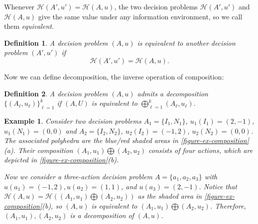 \documentclass[11pt]{article}
\theoremstyle{plain}
\newtheorem{defn}{Definition}
\newtheorem{ex}{Example}
\theoremstyle{remark}
\newcommand{\po}{\mathcal{H}}
\begin{document}
Whenever $\po(A',u')= \po(A,u)$, the two decision problems $\po(A',u')$ and $\po(A,u)$ give the same value under any information environment, so we call them \emph{equivalent}.

\begin{defn}
A decision problem $(A,u)$ is equivalent to another decision problem $(A',u')$ if 
\[\po(A',u')= \po(A,u).\]
\end{defn}


Now we can define decomposition, the inverse operation of composition:
\begin{defn}
A decision problem $(A,u)$ admits a decomposition $\{(A_\ell,u_\ell)\}_{\ell=1}^k$ if $(A,U)$ is equivalent to $\bigoplus_{\ell=1}^k (A_\ell,u_\ell)$.
\end{defn}


\begin{ex}\label{ex-decomposition}
Consider two decision problems $A_1=\{I_1,N_1\}$, $u_1(I_1)=(2,-1)$, $u_1(N_1)=(0,0)$ and $A_2=\{I_2,N_2\}$, $u_2(I_2)=(-1,2)$, $u_2(N_2)=(0,0)$. The associated polyhedra are the blue/red shaded areas in \autoref{figure-ex-composition}(a). Their composition $(A_1,u_1)\bigoplus (A_2,u_2)$ consists of four actions, which are depicted in \autoref{figure-ex-composition}(b).


Now we consider a three-action decision problem $A=\{a_1,a_2,a_3\}$ with $u(a_1)=(-1,2), u(a_2)=(1,1)$, and $u(a_3)=(2,-1)$. Notice that $\po(A,u)=\po((A_1,u_1)\bigoplus (A_2,u_2))$ as the shaded area in \autoref{figure-ex-composition}(b), so $(A,u)$ is equivalent to $(A_1,u_1)\bigoplus (A_2,u_2)$. Therefore, $(A_1,u_1),(A_2,u_2)$ is a decomposition of $(A,u)$.
\end{ex}
\end{document}
